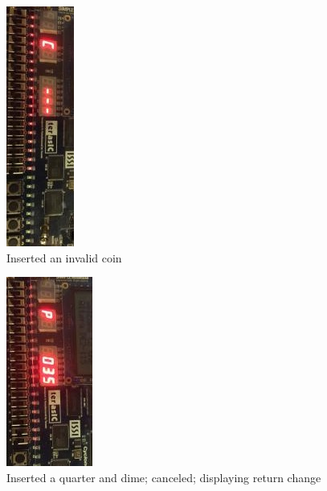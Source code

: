 \documentclass[12pt]{article}
\begin{document}
\begin{figure}[H]
\begin{center}
\includegraphics[scale=1.0,angle=90]{C---.png}
\caption{Inserted an invalid coin}
\label{fig:board7}
\end{center}
\end{figure}

\begin{figure}[H]
\begin{center}
\includegraphics[scale=1.0,angle=90]{P35.png}
\caption{Inserted a quarter and dime; canceled; displaying return change}
\label{fig:board8}
\end{center}
\end{figure}

\newpage
\end{document}
